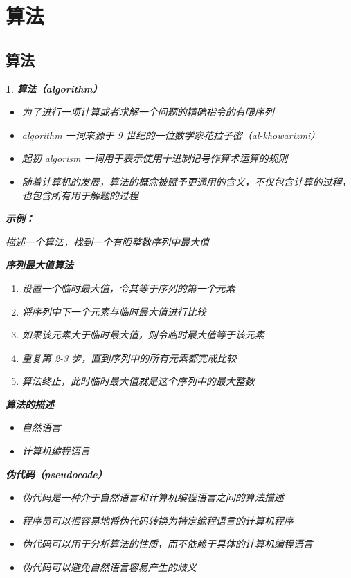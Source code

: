 \documentclass[UTF8]{report}
\theoremstyle{MyLineTheoremStyle} %
\theoremstyle{MyBlockTheoremStyle} %
\theoremstyle{MySubsubsectionStyle} %
\newtheorem{definition}{}
\begin{document}
\section{算法}

\subsection{算法}

\begin{definition}
    \textbf{算法（algorithm）}\par
    \begin{itemize}
        \item 为了进行一项计算或者求解一个问题的精确指令的有限序列
        \item algorithm 一词来源于 9 世纪的一位数学家花拉子密（al-khowarizmi）
        \item 起初 algorism 一词用于表示使用十进制记号作算术运算的规则
        \item 随着计算机的发展，算法的概念被赋予更通用的含义，不仅包含计算的过程，也包含所有用于解题的过程
    \end{itemize}

    \textbf{示例：}\par
    描述一个算法，找到一个有限整数序列中最大值\par
    \textbf{序列最大值算法}\par
    \begin{enumerate}
        \item 设置一个临时最大值，令其等于序列的第一个元素
        \item 将序列中下一个元素与临时最大值进行比较
        \item 如果该元素大于临时最大值，则令临时最大值等于该元素
        \item 重复第 2-3 步，直到序列中的所有元素都完成比较
        \item 算法终止，此时临时最大值就是这个序列中的最大整数
    \end{enumerate}

    \textbf{算法的描述}\par
    \begin{itemize}
        \item 自然语言
        \item 计算机编程语言
    \end{itemize}

    \textbf{伪代码（pseudocode）}\par
    \begin{itemize}
        \item 伪代码是一种介于自然语言和计算机编程语言之间的算法描述
        \item 程序员可以很容易地将伪代码转换为特定编程语言的计算机程序
        \item 伪代码可以用于分析算法的性质，而不依赖于具体的计算机编程语言
        \item 伪代码可以避免自然语言容易产生的歧义
    \end{itemize}


\end{definition}
\end{document}
